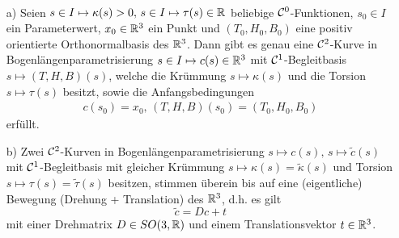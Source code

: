 \begin{satz}\label{satz138} \(\)
 \begin{enumerate}
  \item[a)]Seien \(s \in I \mapsto \kappa(s) > 0, \, s \in I \mapsto \tau(s) \in \mathbb{R}\) beliebige \(\mathcal{C}^0\)-Funktionen, \(s_0 \in I\) ein Parameterwert, \(x_0 \in \mathbb{R}^3\) ein Punkt und \((T_0, H_0, B_0)\) eine positiv orientierte Orthonormalbasis des \(\mathbb{R}^3\). Dann gibt es genau eine \(\mathcal{C}^2\)-Kurve in Bogenlängenparametrisierung \(s \in I \mapsto c(s) \in \mathbb{R}^3\) mit \(\mathcal{C}^1\)-Begleitbasis \(s \mapsto (T, H, B)(s)\), welche die Krümmung \(s \mapsto \kappa(s)\) und die Torsion \(s \mapsto \tau(s)\) besitzt, sowie die Anfangsbedingungen
  \begin{align*}
   c(s_0) = x_0, \, (T, H, B)(s_0) = (T_0, H_0, B_0) \tag{\(\ast\)}
  \end{align*}
  erfüllt.
  \item[b)] Zwei \(\mathcal{C}^2\)-Kurven in Bogenlängenparametrisierung \(s \mapsto c(s), \, s \mapsto \widetilde c(s)\) mit \(\mathcal{C}^1\)-Begleitbasis mit gleicher Krümmung \(s \mapsto \kappa(s) = \widetilde \kappa(s)\) und Torsion \(s \mapsto \tau(s) = \widetilde \tau(s)\) besitzen, stimmen überein bis auf eine (eigentliche) Bewegung (Drehung + Translation) des \(\mathbb{R}^3\), d.h. es gilt
  \[
   \widetilde c = D c + t
  \]
  mit einer Drehmatrix \(D \in SO(3,\mathbb{R})\) und einem Translationsvektor \(t \in \mathbb{R}^3\).
 \end{enumerate}
\end{satz}

